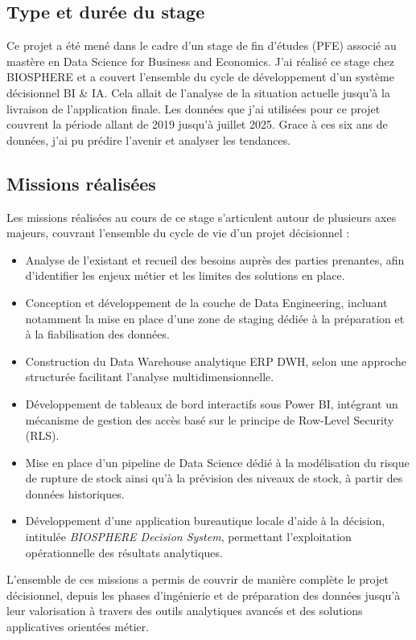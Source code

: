 \subsection{Type et durée du stage}
Ce projet a été mené dans le cadre d'un stage de fin d'études (PFE) associé au mastère en Data Science for Business and Economics. J'ai réalisé ce stage chez BIOSPHERE et a couvert l'ensemble du cycle de développement d'un système décisionnel BI & IA. Cela allait de l'analyse de la situation actuelle jusqu'à la livraison de l'application finale.
Les données que j'ai utilisées pour ce projet couvrent la période allant de 2019 jusqu’à juillet 2025. Grace à ces six ans de données, j’ai pu prédire l'avenir et analyser les tendances.


\subsection{Missions réalisées}
Les missions réalisées au cours de ce stage s’articulent autour de plusieurs axes majeurs, couvrant l’ensemble du cycle de vie d’un projet décisionnel :
\begin{itemize}
    \item Analyse de l’existant et recueil des besoins auprès des parties prenantes, afin d’identifier les enjeux métier et les limites des solutions en place.
    \item Conception et développement de la couche de Data Engineering, incluant notamment la mise en place d’une zone de staging dédiée à la préparation et à la fiabilisation des données.
    \item Construction du Data Warehouse analytique ERP DWH, selon une approche structurée facilitant l’analyse multidimensionnelle.
    \item Développement de tableaux de bord interactifs sous Power BI, intégrant un mécanisme de gestion des accès basé sur le principe de Row-Level Security (RLS).
    \item Mise en place d’un pipeline de Data Science dédié à la modélisation du risque de rupture de stock ainsi qu’à la prévision des niveaux de stock, à partir des données historiques.
    \item Développement d’une application bureautique locale d’aide à la décision, intitulée 
    \textit{BIOSPHERE Decision System}, permettant l’exploitation opérationnelle des résultats analytiques.
\end{itemize}
L’ensemble de ces missions a permis de couvrir de manière complète le projet décisionnel, depuis les phases d’ingénierie et de préparation des données jusqu’à leur valorisation à travers des outils analytiques avancés et des solutions applicatives orientées métier.

